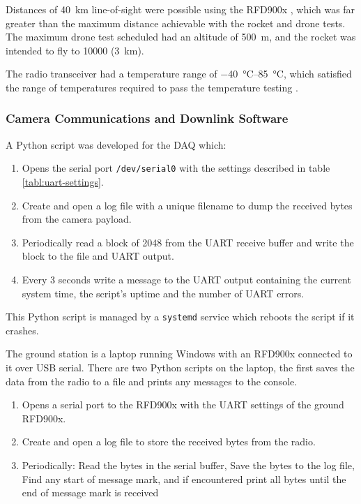 \documentclass{report}
\begin{document}
Distances of \SI{40}{\kilo\metre} line-of-sight were possible using the RFD900x \cite{rfdesign2020rfd900x}, which was far greater than the maximum distance achievable with the rocket and drone tests. The maximum drone test scheduled had an altitude of \SI{500}{\metre}, and the rocket was intended to fly to \SI{10000}{\feet} (\SI{3}{\kilo\metre}).

The radio transceiver had a temperature range of \SIrange{-40}{85}{\degreeCelsius}, which satisfied the range of temperatures required to pass the temperature testing \cite{rfdesign2020rfd900x}.

\subsubsection{Camera Communications and Downlink Software}

A Python script was developed for the DAQ which:

\begin{enumerate}
  \item Opens the serial port \texttt{/dev/serial0} with the settings described in table \ref{tabl:uart-settings}.
  \item Create and open a log file with a unique filename to dump the received bytes from the camera payload.
  \item Periodically read a block of 2048 from the UART receive buffer and write the block to the file and UART output.
  \item Every 3 seconds write a message to the UART output containing the current system time, the script's uptime and the number of UART errors.
\end{enumerate}

This Python script is managed by a \texttt{systemd} service which reboots the script if it crashes.

The ground station is a laptop running Windows with an RFD900x connected to it over USB serial. There are two Python scripts on the laptop, the first saves the data from the radio to a file and prints any messages to the console.

\begin{enumerate}
  \item Opens a serial port to the RFD900x with the UART settings of the ground RFD900x.
  \item Create and open a log file to store the received bytes from the radio.
  \item Periodically:
        \subitem Read the bytes in the serial buffer,
        \subitem Save the bytes to the log file,
        \subitem Find any start of message mark, and if encountered print all bytes until the end of message mark is received
\end{enumerate}
\end{document}
